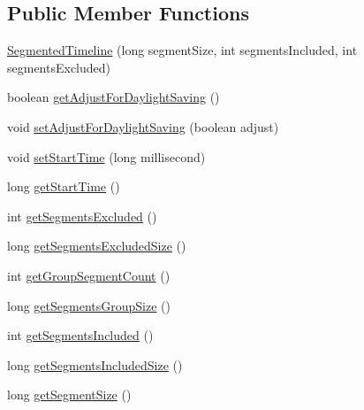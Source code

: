 \subsection*{Public Member Functions}
\begin{DoxyCompactItemize}
\item 
\mbox{\hyperlink{classorg_1_1jfree_1_1chart_1_1axis_1_1_segmented_timeline_a0a573ec424a6813b42439491e791fc1b}{Segmented\+Timeline}} (long segment\+Size, int segments\+Included, int segments\+Excluded)
\item 
boolean \mbox{\hyperlink{classorg_1_1jfree_1_1chart_1_1axis_1_1_segmented_timeline_a6ff0566a1d11adaa23a455d594f2876d}{get\+Adjust\+For\+Daylight\+Saving}} ()
\item 
void \mbox{\hyperlink{classorg_1_1jfree_1_1chart_1_1axis_1_1_segmented_timeline_ad4081bf713881a6a1d1cbbaea0f88136}{set\+Adjust\+For\+Daylight\+Saving}} (boolean adjust)
\item 
void \mbox{\hyperlink{classorg_1_1jfree_1_1chart_1_1axis_1_1_segmented_timeline_a24a2da5458afc053a5aa0fad092c1d0f}{set\+Start\+Time}} (long millisecond)
\item 
long \mbox{\hyperlink{classorg_1_1jfree_1_1chart_1_1axis_1_1_segmented_timeline_a6f0897db2134bb7fb9e59236ca782de0}{get\+Start\+Time}} ()
\item 
int \mbox{\hyperlink{classorg_1_1jfree_1_1chart_1_1axis_1_1_segmented_timeline_a8c4c4826474f82c2891737fa3b66f414}{get\+Segments\+Excluded}} ()
\item 
long \mbox{\hyperlink{classorg_1_1jfree_1_1chart_1_1axis_1_1_segmented_timeline_a76f19fd7b93432dd3c3424c552e3219b}{get\+Segments\+Excluded\+Size}} ()
\item 
int \mbox{\hyperlink{classorg_1_1jfree_1_1chart_1_1axis_1_1_segmented_timeline_adbb99ea00c66c4f4b810c7d2dde51417}{get\+Group\+Segment\+Count}} ()
\item 
long \mbox{\hyperlink{classorg_1_1jfree_1_1chart_1_1axis_1_1_segmented_timeline_ac915b597b20ca984a5d785b546c31b46}{get\+Segments\+Group\+Size}} ()
\item 
int \mbox{\hyperlink{classorg_1_1jfree_1_1chart_1_1axis_1_1_segmented_timeline_abea5687d00b14c38d6b99a71443c31e6}{get\+Segments\+Included}} ()
\item 
long \mbox{\hyperlink{classorg_1_1jfree_1_1chart_1_1axis_1_1_segmented_timeline_a5718aa9974ca6e82c0243a847b2e6286}{get\+Segments\+Included\+Size}} ()
\item 
long \mbox{\hyperlink{classorg_1_1jfree_1_1chart_1_1axis_1_1_segmented_timeline_a639b707daebe1d9cadb3e76aa5dd4159}{get\+Segment\+Size}} ()

\end{DoxyCompactItemize}
